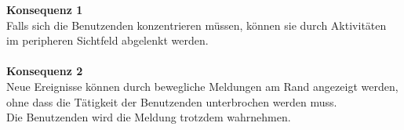
%
\textbf{Konsequenz 1} \\
Falls sich die Benutzenden konzentrieren müssen, können sie durch Aktivitäten im peripheren Sichtfeld
abgelenkt werden.
\\\\
\textbf{Konsequenz 2}\\
Neue Ereignisse können durch bewegliche Meldungen am Rand angezeigt werden,
ohne dass die Tätigkeit der Benutzenden unterbrochen werden muss. 
\\
Die Benutzenden wird die Meldung trotzdem wahrnehmen.